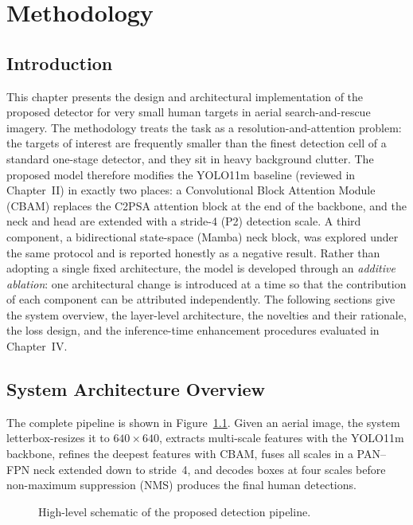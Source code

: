 \chapter{Methodology}

\section{Introduction}
This chapter presents the design and architectural implementation of the proposed
detector for very small human targets in aerial search-and-rescue imagery. The
methodology treats the task as a resolution-and-attention problem: the targets of
interest are frequently smaller than the finest detection cell of a standard
one-stage detector, and they sit in heavy background clutter. The proposed model
therefore modifies the YOLO11m baseline (reviewed in Chapter~II) in exactly two
places: a Convolutional Block Attention Module (CBAM) replaces the C2PSA attention
block at the end of the backbone, and the neck and head are extended with a
stride-4 (P2) detection scale. A third component, a bidirectional state-space
(Mamba) neck block, was explored under the same protocol and is reported honestly
as a negative result. Rather than adopting a single fixed architecture, the model
is developed through an \emph{additive ablation}: one architectural change is
introduced at a time so that the contribution of each component can be attributed
independently. The following sections give the system overview, the layer-level
architecture, the novelties and their rationale, the loss design, and the
inference-time enhancement procedures evaluated in Chapter~IV.

\section{System Architecture Overview}
The complete pipeline is shown in Figure~\ref{fig:framework}. Given an aerial
image, the system letterbox-resizes it to $640 \times 640$, extracts multi-scale
features with the YOLO11m backbone, refines the deepest features with CBAM,
fuses all scales in a PAN--FPN neck extended down to stride~4, and decodes boxes
at four scales before non-maximum suppression (NMS) produces the final human
detections.

\begin{figure}[H]
  \centering
  
  \caption{High-level schematic of the proposed detection pipeline.}
  \label{fig:framework}
\end{figure}

